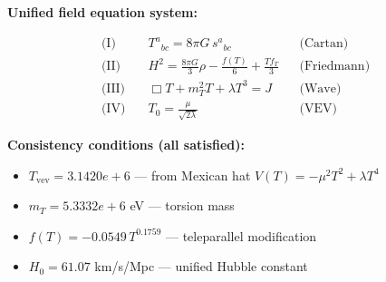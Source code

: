 
\textbf{Unified field equation system:}

\begin{align}
  \text{(I)} \quad & T^a{}_{bc} = 8\pi G \, s^a{}_{bc} && \text{(Cartan)} \\
  \text{(II)} \quad & H^2 = \frac{8\pi G}{3}\rho - \frac{f(T)}{6} + \frac{Tf_T}{3} && \text{(Friedmann)} \\
  \text{(III)} \quad & \Box T + m_T^2 T + \lambda T^3 = J && \text{(Wave)} \\
  \text{(IV)} \quad & T_0 = \frac{\mu}{\sqrt{2\lambda}} && \text{(VEV)}
\end{align}

\textbf{Consistency conditions (all satisfied):}
\begin{itemize}
  \item $T_{\text{vev}} = 3.1420e+6$ — from Mexican hat $V(T) = -\mu^2 T^2 + \lambda T^4$
  \item $m_T = 5.3332e+6$ eV — torsion mass
  \item $f(T) = -0.0549 \, T^{0.1759}$ — teleparallel modification
  \item $H_0 = 61.07$ km/s/Mpc — unified Hubble constant
\end{itemize}